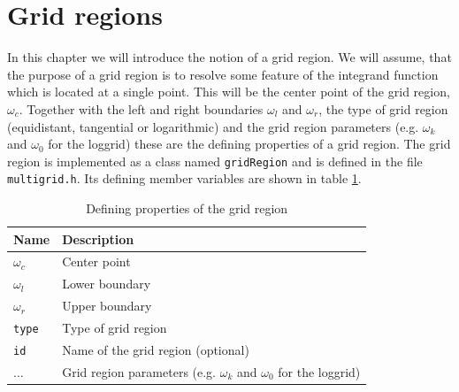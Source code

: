 \section{Grid regions}\label{sec:grid_regions}
In this chapter we will introduce the notion of a grid region. We will assume, that the purpose of a grid region is to resolve some feature of the integrand function which is located at a single point. This will be the center point of the grid region, $\omega_c$. Together with the left and right boundaries $\omega_l$ and $\omega_r$, the type of grid region (equidistant, tangential or logarithmic) and the grid region parameters (e.g. $\omega_k$ and $\omega_0$ for the loggrid) these are the defining properties of a grid region. The grid region is implemented as a class named \texttt{gridRegion} and is defined in the file \texttt{multigrid.h}. Its defining member variables are shown in table \ref{tab:grid_region_defining_members}.
\begin{table}[h]
	\begin{center}
		\begin{tabular}{ll}
		Name & Description \\ 
		\hline
		$\omega_c$  & Center point \\
		$\omega_l$  & Lower boundary \\
		$\omega_r$  & Upper boundary \\
		\texttt{type}  & Type of grid region \\
		\texttt{id}  & Name of the grid region (optional) \\
		 $\dots$ & Grid region parameters (e.g. $\omega_k$ and $\omega_0$ for the loggrid) \\
		\end{tabular}
	\end{center}
	\caption{Defining properties of the grid region}
	\label{tab:grid_region_defining_members}
\end{table}

